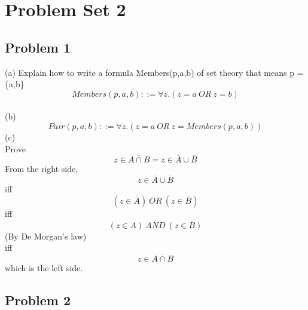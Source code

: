 \documentclass{article}
\begin{document}
\section*{Problem Set 2}

\subsection*{Problem 1}

(a) Explain how to write a formula Members(p,a,b) of set theory that means p = \{a,b\}
\[ Members(p,a,b) ::= \forall z.(z=a\ OR\ z=b) \]
\\
(b)
\[ Pair(p,a,b) ::= \forall z.(z = a\ OR \ z=Members(p,a,b)) \]
(c)\\
Prove
\[ z \in \overline{A \cap B} = z \in \overline{A} \cup \overline{B} \]
From the right side,
\[ z \in \overline{A} \cup \overline{B} \]
iff
\[ (z\in \overline{A})\ OR\ (z \in \overline{B}) \]
iff
\[ \overline{(z \in A)\ AND \ (z \in B)} \]
(By De Morgan's law)\\
iff
\[ z \in \overline{A \cap B} \]
which is the left side.

\subsection*{Problem 2}
\end{document}
